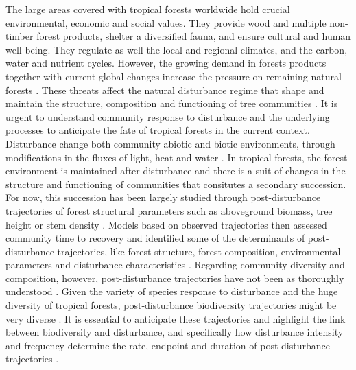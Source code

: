 \documentclass[fleqn,10pt]{ArtEcoFoG} %
\begin{document}
The large areas covered with tropical forests worldwide hold crucial
environmental, economic and social values. They provide wood and
multiple non-timber forest products, shelter a diversified fauna, and
ensure cultural and human well-being. They regulate as well the local
and regional climates, and the carbon, water and nutrient cycles.
However, the growing demand in forests products together with current
global changes increase the pressure on remaining natural forests
\citep{Morales-Hidalgo2015}. These threats affect the natural
disturbance regime that shape and maintain the structure, composition
and functioning of tree communities
\citep{Schnitzer2001, Anderson-Teixeira2013, Sist2015}. It is urgent to
understand community response to disturbance and the underlying
processes to anticipate the fate of tropical forests in the current
context. Disturbance change both community abiotic and biotic
environments, through modifications in the fluxes of light, heat and
water \citep{Goulamoussene2017}. In tropical forests, the forest
environment is maintained after disturbance and there is a suit of
changes in the structure and functioning of communities that consitutes
a secondary succession. For now, this succession has been largely
studied through post-disturbance trajectories of forest structural
parameters such as aboveground biomass, tree height or stem density
\citep{Piponiot2016, Rutishauser2016}. Models based on observed
trajectories then assessed community time to recovery and identified
some of the determinants of post-disturbance trajectories, like forest
structure, forest composition, environmental parameters and disturbance
characteristics \citep{Herault2018}. Regarding community diversity and
composition, however, post-disturbance trajectories have not been as
thoroughly understood \citep{Guitet2018, Molino2001}. Given the variety
of species response to disturbance and the huge diversity of tropical
forests, post-disturbance biodiversity trajectories might be very
diverse \citep{Lindenmayer2012, Garcia_florez2017}. It is essential to
anticipate these trajectories and highlight the link between
biodiversity and disturbance, and specifically how disturbance intensity
and frequency determine the rate, endpoint and duration of
post-disturbance trajectories \citep{Chazdon2003a, Willig2018}.
\end{document}

